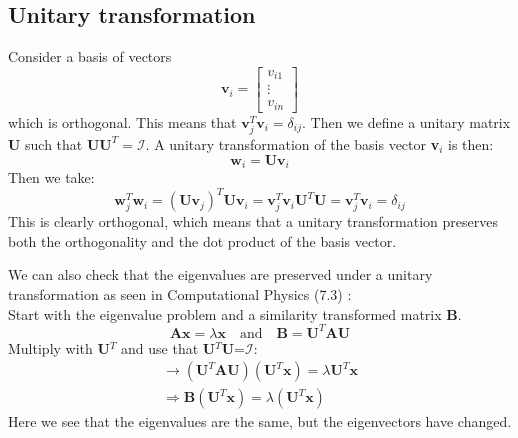\documentclass[12pt,a4paper,english]{article}
\begin{document}
\subsection{Unitary transformation}
\label{sect_unitary_transf}
Consider a basis of vectors 
\[\textbf{v}_i = \begin{bmatrix}
v_{i1}\\
\vdots\\
v_{in}
\end{bmatrix}\]
which is orthogonal. This means that $\textbf{v}_j^T\textbf{v}_i=\delta_{ij}$. Then we define a unitary matrix $\textbf{U}$ such that $\textbf{U}\textbf{U}^T=\mathcal{I}$. A unitary transformation of the basis vector \textbf{v}$_i$ is then:
\begin{equation*}
\textbf{w}_i=\textbf{U}\textbf{v}_i
\end{equation*}
Then we take:
\begin{equation*}
\textbf{w}^T_j\textbf{w}_i=(\textbf{U}\textbf{v}_j)^T\textbf{U}\textbf{v}_i=\textbf{v}_j^T\textbf{v}_i\textbf{U}^T\textbf{U}=\textbf{v}_j^T\textbf{v}_i=\delta_{ij}
\end{equation*}
This is clearly orthogonal, which means that a unitary transformation preserves both the orthogonality and the dot product of the basis vector.

We can also check that the eigenvalues are preserved under a unitary transformation as seen in Computational Physics (7.3) \cite{lectures}:\\
Start with the eigenvalue problem and a similarity transformed matrix \textbf{B}. 
\begin{equation}
\label{eq:sim_transf}
\textbf{Ax}=\lambda\textbf{x}\quad \text{and}\quad \textbf{B}=\textbf{U}^T\textbf{A}\textbf{U}
\end{equation}
Multiply with \textbf{U}$^T$ and use that \textbf{U}$^T$\textbf{U}=$\mathcal{I}$:
\begin{align*}
\rightarrow (\textbf{U}^T\textbf{A}\textbf{U})(\textbf{U}^T\textbf{x})=\lambda\textbf{U}^T\textbf{x}\\
\Rightarrow \textbf{B}(\textbf{U}^T\textbf{x})=\lambda(\textbf{U}^T\textbf{x})
\end{align*}
Here we see that the eigenvalues are the same, but the eigenvectors have changed.
\end{document}

